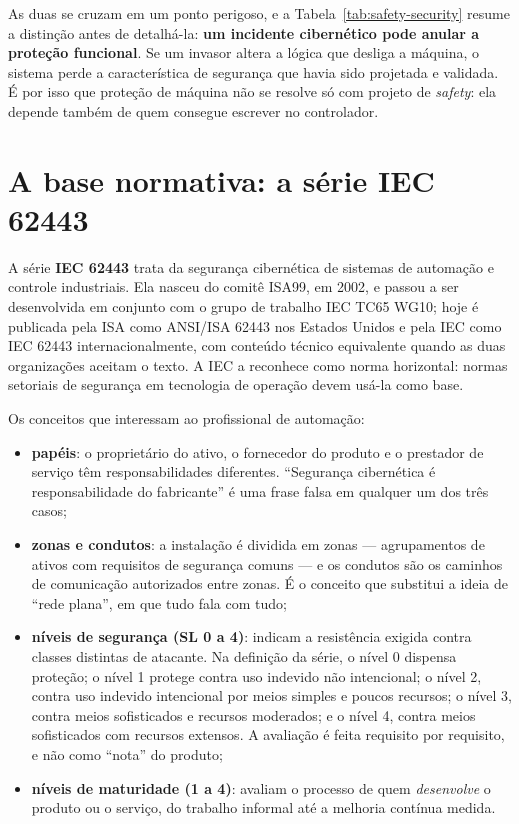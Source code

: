 As duas se cruzam em um ponto perigoso, e a Tabela~\ref{tab:safety-security} resume a distinção
antes de detalhá-la: \textbf{um incidente cibernético pode anular a proteção funcional}. Se um invasor altera a lógica que desliga a máquina, o sistema perde a característica de
segurança que havia sido projetada e validada. É por isso que proteção de máquina não se resolve só
com projeto de \emph{safety}: ela depende também de quem consegue escrever no controlador.


\section{A base normativa: a série IEC 62443}

A série \textbf{IEC 62443} trata da segurança cibernética de sistemas de automação e controle
industriais. Ela nasceu do comitê ISA99, em 2002, e passou a ser desenvolvida em conjunto com o grupo
de trabalho IEC TC65 WG10; hoje é publicada pela ISA como ANSI/ISA 62443 nos Estados Unidos e pela
IEC como IEC 62443 internacionalmente, com conteúdo técnico equivalente quando as duas organizações
aceitam o texto. A IEC a reconhece como norma horizontal: normas setoriais de segurança em
tecnologia de operação devem usá-la como base.

Os conceitos que interessam ao profissional de automação:

\begin{itemize}
  \item \textbf{papéis}: o proprietário do ativo, o fornecedor do produto e o prestador de serviço
        têm responsabilidades diferentes. ``Segurança cibernética é responsabilidade do fabricante''
        é uma frase falsa em qualquer um dos três casos;
  \item \textbf{zonas e condutos}: a instalação é dividida em zonas --- agrupamentos de ativos com
        requisitos de segurança comuns --- e os condutos são os caminhos de comunicação autorizados
        entre zonas. É o conceito que substitui a ideia de ``rede plana'', em que tudo fala com tudo;
  \item \textbf{níveis de segurança (SL 0 a 4)}: indicam a resistência exigida contra classes
        distintas de atacante. Na definição da série, o nível 0 dispensa proteção; o nível 1 protege
        contra uso indevido não intencional; o nível 2, contra uso indevido intencional por meios
        simples e poucos recursos; o nível 3, contra meios sofisticados e recursos moderados; e o
        nível 4, contra meios sofisticados com recursos extensos. A avaliação é feita requisito por
        requisito, e não como ``nota'' do produto;
  \item \textbf{níveis de maturidade (1 a 4)}: avaliam o processo de quem \emph{desenvolve} o produto
        ou o serviço, do trabalho informal até a melhoria contínua medida.
\end{itemize}

